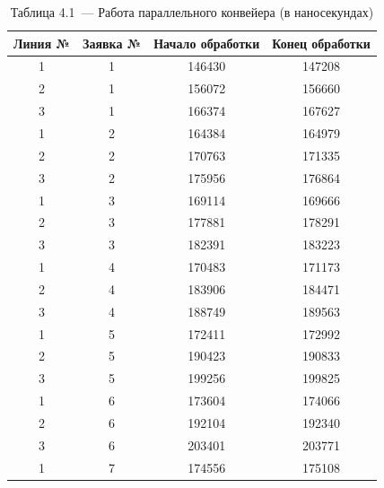 \documentclass[12pt, a4paper]{report}
\begin{document}
	\begin{table} [H]
		\caption*{Таблица 4.1~--- Работа параллельного конвейера (в наносекундах)}
		\begin{tabular}[l]{|c c c c|}
			\hline
			Линия № & Заявка № & Начало обработки & Конец обработки  \\\hline
			
			1 & 1 & 146430 & 147208  \\ 
			
			2 & 1 & 156072 & 156660  \\ 
			
			3 & 1 & 166374 & 167627  \\\hline
			
			1 & 2 & 164384 & 164979  \\ 
			
			2 & 2 & 170763 & 171335  \\ 
			
			3 & 2 & 175956 & 176864  \\\hline
			
			1 & 3 & 169114 & 169666  \\ 
			
			2 & 3 & 177881 & 178291  \\ 
			
			3 & 3 & 182391 & 183223  \\\hline
			
			1 & 4 & 170483 & 171173  \\ 
			
			2 & 4 & 183906 & 184471  \\ 
			
			3 & 4 & 188749 & 189563  \\\hline
			
			1 & 5 & 172411 & 172992  \\ 
			
			2 & 5 & 190423 & 190833  \\ 
			
			3 & 5 & 199256 & 199825  \\\hline
			
			1 & 6 & 173604 & 174066  \\ 
			
			2 & 6 & 192104 & 192340  \\ 
			
			3 & 6 & 203401 & 203771  \\\hline
			
			1 & 7 & 174556 & 175108  \\ 
			

\end{tabular}
\end{table}
\end{document}

